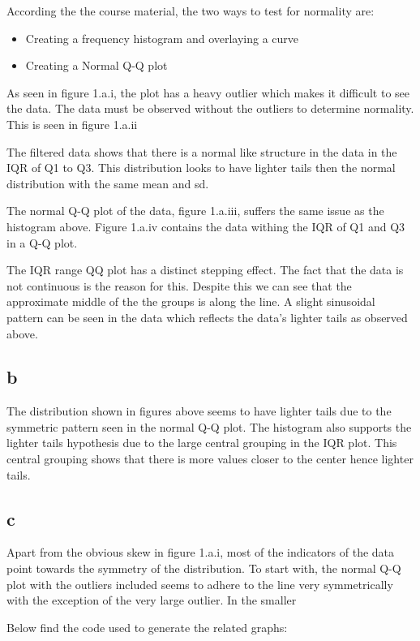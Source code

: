 \documentclass[a4paper, 12pt]{article}
\begin{document}
        According the the course material, the two ways to test for normality are: 
        \begin{itemize}
            \item Creating a frequency histogram and overlaying a curve
            \item Creating a Normal Q-Q plot
        \end{itemize}
        As seen in figure 1.a.i, the plot has a heavy outlier which makes it difficult to see the data. The data must be observed without the outliers to determine normality. This is seen in figure 1.a.ii

        The filtered data shows that there is a normal like structure in the data in the IQR of Q1 to Q3. This distribution looks to have lighter tails then the normal distribution with the same mean and sd.


        The normal Q-Q plot of the data, figure 1.a.iii, suffers the same issue as the histogram above. Figure 1.a.iv contains the data withing the IQR of Q1 and Q3 in a Q-Q plot.

        The IQR range QQ plot has a distinct stepping effect. The fact that the data is not continuous is the reason for this. Despite this we can see that the approximate middle of the the groups is along the line. A slight sinusoidal pattern can be seen in the data which reflects the data's lighter tails as observed above. 

    \subsection{b}
        The distribution shown in figures above seems to have lighter tails due to the symmetric pattern seen in the normal Q-Q plot. The histogram also supports the lighter tails hypothesis due to the large central grouping in the IQR plot. This central grouping shows that there is more values closer to the center hence lighter tails.

    \subsection{c}
        Apart from the obvious skew in figure 1.a.i, most of the indicators of the data point towards the symmetry of the distribution. To start with, the normal Q-Q plot with the outliers included seems to adhere to the line very symmetrically with the exception of the very large outlier. In the smaller

        Below find the code used to generate the related graphs:
        
\end{document}
